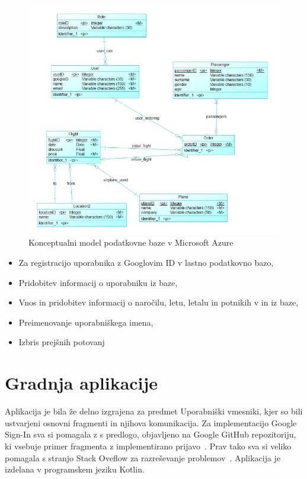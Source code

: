 \documentclass[11pt,a4paper]{article}
\begin{document}
\begin{figure}[htb]
	\centerline{\includegraphics[width=1.0\textwidth]{bazaVAzure.png}}
	\caption{Konceptualni model podatkovne baze v Microsoft Azure}
	\label{sl:koncept}
\end{figure}
\begin{itemize}
	\item Za registracijo uporabnika z Googlovim ID v lastno podatkovno bazo,
	\item Pridobitev informacij o uporabniku iz baze,
	\item Vnos in pridobitev informacij o naročilu, letu, letalu in potnikih v in iz baze,
	\item Preimenovanje uporabniškega imena,
	\item Izbris prejšnih potovanj

\end{itemize}

\section{Gradnja aplikacije}

Aplikacija je bila že delno izgrajena za predmet Uporabniški vmesniki, kjer so bili ustvarjeni osnovni fragmenti in njihova komunikacija.
Za implementacijo Google Sign-In sva si pomagala z s predlogo, objavljeno na Google GitHub repozitoriju, ki vsebuje primer fragmenta z implementirano prijavo~\cite{loginSample}.
Prav tako sva si veliko pomagala s stranjo Stack Oveflow za razreševanje problemov~\cite{stack}.
Aplikacija je izdelana v programskem jeziku Kotlin.
\end{document}
